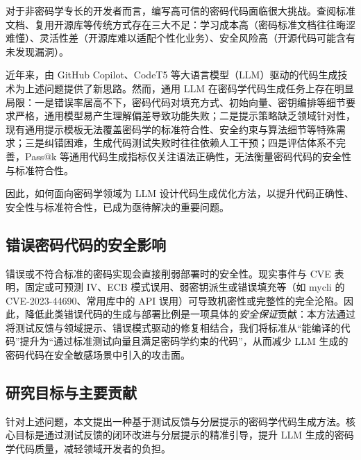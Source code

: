 \documentclass[12pt]{llncs}
\begin{document}
对于非密码学专长的开发者而言，编写高可信的密码代码面临很大挑战。查阅标准文档、复用开源库等传统方式存在三大不足：学习成本高（密码标准文档往往晦涩难懂）、灵活性差（开源库难以适配个性化业务）、安全风险高（开源代码可能含有未发现漏洞）。

近年来，由 GitHub Copilot、CodeT5 等大语言模型（LLM）驱动的代码生成技术为上述问题提供了新思路。然而，通用 LLM 在密码学代码生成任务上存在明显局限：一是错误率居高不下，密码代码对填充方式、初始向量、密钥编排等细节要求严格，通用模型易产生理解偏差导致功能失败；二是提示策略缺乏领域针对性，现有通用提示模板无法覆盖密码学的标准符合性、安全约束与算法细节等特殊需求；三是纠错困难，生成代码测试失败时往往依赖人工干预；四是评估体系不完善，Pass@k 等通用代码生成指标仅关注语法正确性，无法衡量密码代码的安全性与标准符合性。

因此，如何面向密码学领域为 LLM 设计代码生成优化方法，以提升代码正确性、安全性与标准符合性，已成为亟待解决的重要问题。

\subsection{错误密码代码的安全影响}
\label{subsec:security_implications}
错误或不符合标准的密码实现会直接削弱部署时的安全性。现实事件与 CVE 表明，固定或可预测 IV、ECB 模式误用、弱密钥派生或错误填充等（如 mycli 的 CVE-2023-44690、常用库中的 API 误用）可导致机密性或完整性的完全沦陷。因此，降低此类错误代码的生成与部署比例是一项具体的\emph{安全保证}贡献：本方法通过将测试反馈与领域提示、错误模式驱动的修复相结合，我们将标准从“能编译的代码”提升为“通过标准测试向量且满足密码学约束的代码”，从而减少 LLM 生成的密码代码在安全敏感场景中引入的攻击面。

\subsection{研究目标与主要贡献}
针对上述问题，本文提出一种基于测试反馈与分层提示的密码学代码生成方法。核心目标是通过测试反馈的闭环改进与分层提示的精准引导，提升 LLM 生成的密码学代码质量，减轻领域开发者的负担。
\end{document}
